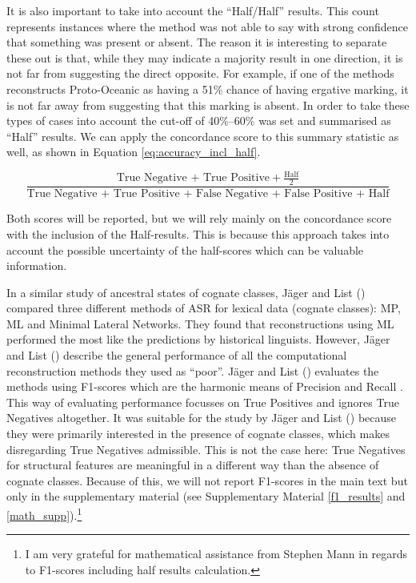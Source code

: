 \documentclass[12pt,letterpaper]{article}
\begin{document}
It is also important to take into account the ``Half/Half'' results. This count represents instances where the method was not able to say with strong confidence that something was present or absent. The reason it is interesting to separate these out is that, while they may indicate a majority result in one direction, it is not far from suggesting the direct opposite. For example, if one of the methods reconstructs Proto-Oceanic as having a 51\% chance of having ergative marking, it is not far away from suggesting that this marking is absent. In order to take these types of cases into account the cut-off of 40\%--60\% was set and summarised as ``Half'' results. We can apply the concordance score to this summary statistic as well, as shown in Equation \eqref{eq:accuracy_incl_half}. 

\begin{equation}\label{eq:accuracy_incl_half}
\frac{\text{True Negative + True Positive} + \frac{\text{Half}}{2}}{\text{True Negative + True Positive + False Negative + False Positive + Half}}
\end{equation}

Both scores will be reported, but we will rely mainly on the concordance score with the inclusion of the Half-results. This is because this approach takes into account the possible uncertainty of the half-scores which can be valuable information.

In a similar study of ancestral states of cognate classes, J\"ager and List (\citeyear{jager2018using}) compared three different methods of ASR for lexical data (cognate classes): MP, ML and Minimal Lateral Networks. They found that reconstructions using ML performed the most like the predictions by historical linguists. However, J\"ager and List (\citeyear{jager2018using}) describe the general performance of all the computational reconstruction methods they used as ``poor''. J\"ager and List (\citeyear{jager2018using}) evaluates the methods using F1-scores which are the harmonic means of Precision and Recall \citep{sasaki2007truth}. This way of evaluating performance focusses on True Positives and ignores True Negatives altogether. It was suitable for the study by J\"ager and List (\citeyear{jager2018using}) because they were primarily interested in the presence of cognate classes, which makes disregarding True Negatives admissible. This is not the case here: True Negatives for structural features are meaningful in a different way than the absence of cognate classes. Because of this, we will not report F1-scores in the main text but only in the supplementary material (see Supplementary Material \ref{f1_results} and \ref{math_supp}).\footnote{I am very grateful for mathematical assistance from Stephen Mann in regards to F1-scores including half results calculation.} %
\end{document}
